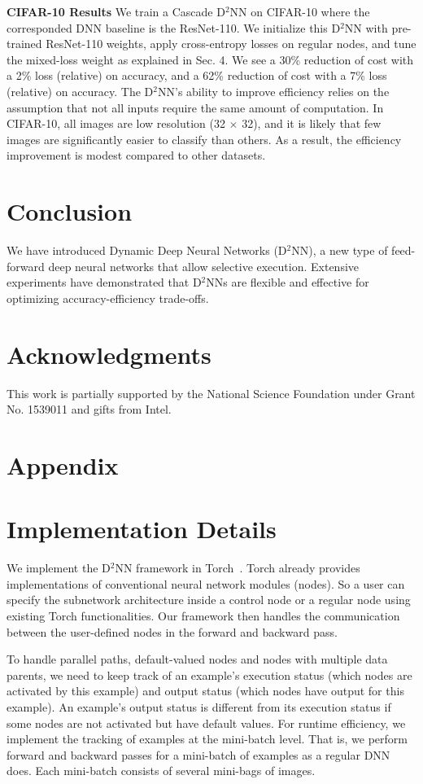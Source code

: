 \documentclass[10pt,twocolumn,letterpaper]{article}
\newcommand{\smallparagraph}[1]{\smallskip \noindent \textbf{#1}}
\begin{document}
\smallparagraph{CIFAR-10 Results}
We train a Cascade D$^2$NN on CIFAR-10 where the corresponded DNN baseline is the ResNet-110. We initialize this D$^2$NN with pre-trained ResNet-110 weights, apply cross-entropy losses on regular nodes, and tune the mixed-loss weight as explained in Sec. 4. 
We see a 30\% reduction of cost with a 2\% loss (relative) on accuracy, and a 62\% reduction of cost with a 7\% loss (relative) on accuracy. 
The D$^2$NN's ability to improve efficiency relies on the assumption that not all inputs require the same amount of computation. In CIFAR-10, all images are low resolution (32 $\times$ 32), and it is likely that few images are significantly easier to classify than others. As a result, the efficiency improvement is modest compared to other datasets.

\section{Conclusion}
We have introduced Dynamic Deep Neural Networks (D$^2$NN), a new type of feed-forward deep neural
networks that allow selective execution. Extensive experiments have demonstrated that
D$^2$NNs are flexible and effective for optimizing accuracy-efficiency trade-offs. 

\section{Acknowledgments}
This work is partially supported by the National Science Foundation under
Grant No. 1539011 and gifts from Intel.


\section*{Appendix}
\appendix
\renewcommand{\appendixname}{Appendix~\Alph{section}}
\section{Implementation Details}

  We implement the D$^2$NN framework in Torch~\cite{torch}. Torch
  already provides implementations of conventional neural network modules
  (nodes). So a user can specify the subnetwork architecture inside a
  control node or a regular node using existing Torch functionalities. Our framework then
  handles the communication between the user-defined nodes in the forward and backward
  pass. 

   To handle parallel paths, default-valued nodes and nodes with multiple data parents,
   we need to keep track of an example's execution status (which nodes are activated by this example)
   and output status (which nodes have output for this example). An example's output status is different from its execution status if some nodes are not
   activated but have default values.
   For runtime efficiency, we implement the tracking of examples at
   the mini-batch level. That is, we perform forward and backward passes for
   a mini-batch of examples as a regular DNN does. Each mini-batch consists of
   several mini-bags of images.
  
\end{document}
